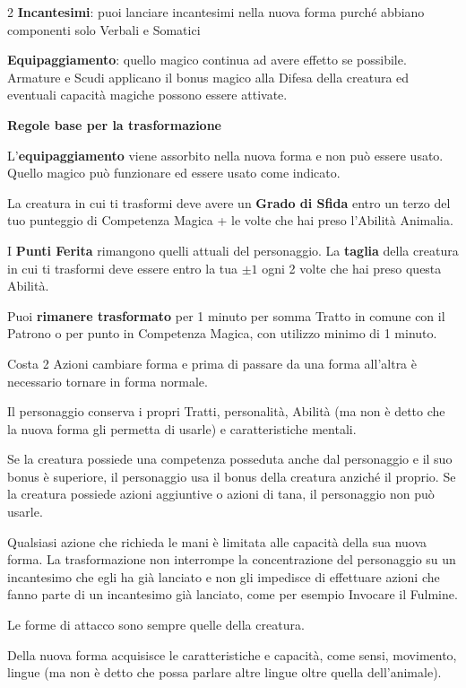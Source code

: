 \begin{multicols}{2}
\textbf{Incantesimi}: puoi lanciare incantesimi nella nuova forma purché abbiano componenti solo Verbali e Somatici

\textbf{Equipaggiamento}: quello magico continua ad avere effetto se possibile. Armature e Scudi applicano il bonus magico alla Difesa della creatura ed eventuali capacità magiche possono essere attivate.

\medskip

\textbf{Regole base per la trasformazione}

\medskip

L'\textbf{equipaggiamento} viene assorbito nella nuova forma e non può essere usato. Quello magico può funzionare ed essere usato come indicato.

La creatura in cui ti trasformi deve avere un \textbf{Grado di Sfida} entro un terzo del tuo punteggio di Competenza Magica + le volte che hai preso l'Abilità Animalia.

I \textbf{Punti Ferita} rimangono quelli attuali del personaggio. La \textbf{taglia} della creatura in cui ti trasformi deve essere entro la tua $\pm 1$ ogni 2 volte che hai preso questa Abilità.

Puoi \textbf{rimanere trasformato} per 1 minuto per somma Tratto in comune con il Patrono  o per punto in Competenza Magica, con utilizzo minimo di 1 minuto.

Costa 2 Azioni cambiare forma e prima di passare da una forma all'altra è necessario tornare in forma normale.

Il personaggio conserva i propri Tratti, personalità, Abilità (ma non è detto che la nuova forma gli permetta di usarle) e caratteristiche mentali.

Se la creatura possiede una competenza posseduta anche dal personaggio e il suo bonus è superiore, il personaggio usa il bonus della creatura anziché il proprio. Se la creatura possiede azioni aggiuntive o azioni di tana, il personaggio non può usarle.

Qualsiasi azione che richieda le mani è limitata alle capacità della sua nuova forma. La trasformazione non interrompe la concentrazione del personaggio su un incantesimo che egli ha già lanciato e non gli impedisce di effettuare azioni che fanno parte di un incantesimo già lanciato, come per esempio Invocare il Fulmine.

Le forme di attacco sono sempre quelle della creatura.

Della nuova forma acquisisce le caratteristiche e capacità, come sensi, movimento, lingue (ma non è detto che possa parlare altre lingue oltre quella dell'animale).


\end{multicols}
